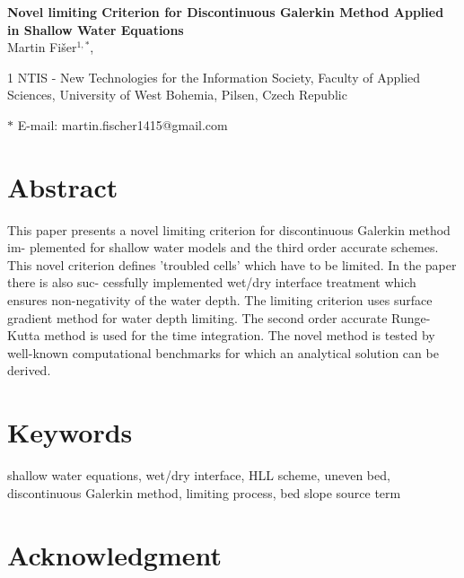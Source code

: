 \documentclass[12pt]{article}
\date{}
\begin{document}
\begin{flushleft}
{\Large
\textbf{Novel limiting Criterion for Discontinuous Galerkin Method Applied in Shallow Water Equations}
}
\\
Martin Fi\v{s}er$^{1,\ast}$,


1 NTIS - New Technologies for the Information Society, Faculty of Applied Sciences,
University of West Bohemia, Pilsen, Czech Republic


$\ast$ E-mail: martin.fischer1415@gmail.com
\end{flushleft}


\section*{Abstract} 

This paper presents a novel limiting criterion for discontinuous Galerkin method im-
plemented for shallow water models and the third order accurate schemes. This novel
criterion defines ’troubled cells’ which have to be limited. In the paper there is also suc-
cessfully implemented wet/dry interface treatment which ensures non-negativity of the
water depth. The limiting criterion uses surface gradient method for water depth limiting.
The second order accurate Runge-Kutta method is used for the time integration. The
novel method is tested by well-known computational benchmarks for which an analytical
solution can be derived.

\section*{Keywords}

shallow water equations, wet/dry interface, HLL scheme, 
uneven bed, discontinuous Galerkin method, limiting process, bed slope source term






%


\section*{Acknowledgment}


{}
\end{document}
